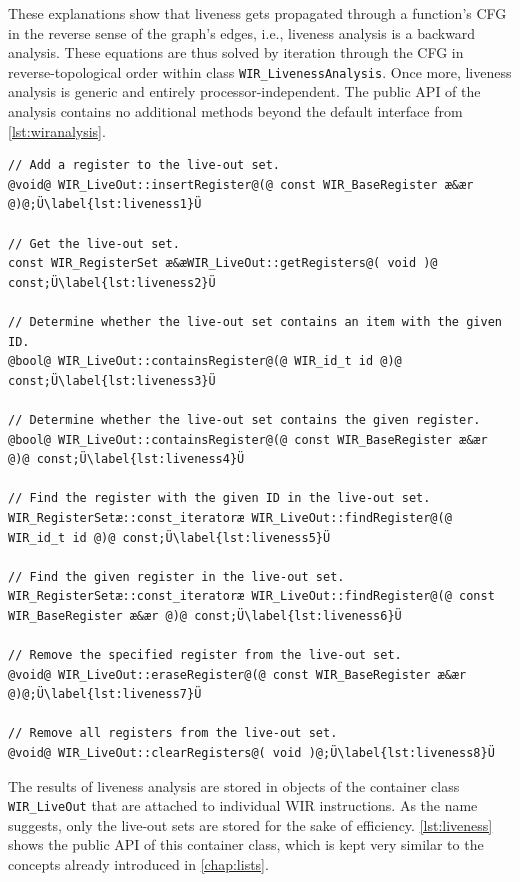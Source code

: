 These explanations show that liveness gets propagated through a function's \gls{CFG} in the reverse sense of the graph's edges, i.e., liveness analysis is a backward analysis.
These equations are thus solved by iteration through the \gls{CFG} in reverse-topological order within class \texttt{WIR\_LivenessAnalysis}.
Once more, liveness analysis is generic and entirely processor-independent.
The public \gls{API} of the analysis contains no additional methods beyond the default interface from \cref{lst:wiranalysis}.

\begin{lstlisting}[style=code,float=ht,caption={Liveness Handling of Container Class \texttt{WIR\_LiveOut}},label=lst:liveness]
// Add a register to the live-out set.
@void@ WIR_LiveOut::insertRegister@(@ const WIR_BaseRegister æ&ær @)@;Ü\label{lst:liveness1}Ü

// Get the live-out set.
const WIR_RegisterSet æ&æWIR_LiveOut::getRegisters@( void )@ const;Ü\label{lst:liveness2}Ü

// Determine whether the live-out set contains an item with the given ID.
@bool@ WIR_LiveOut::containsRegister@(@ WIR_id_t id @)@ const;Ü\label{lst:liveness3}Ü

// Determine whether the live-out set contains the given register.
@bool@ WIR_LiveOut::containsRegister@(@ const WIR_BaseRegister æ&ær @)@ const;Ü\label{lst:liveness4}Ü

// Find the register with the given ID in the live-out set.
WIR_RegisterSetæ::const_iteratoræ WIR_LiveOut::findRegister@(@ WIR_id_t id @)@ const;Ü\label{lst:liveness5}Ü

// Find the given register in the live-out set.
WIR_RegisterSetæ::const_iteratoræ WIR_LiveOut::findRegister@(@ const WIR_BaseRegister æ&ær @)@ const;Ü\label{lst:liveness6}Ü

// Remove the specified register from the live-out set.
@void@ WIR_LiveOut::eraseRegister@(@ const WIR_BaseRegister æ&ær @)@;Ü\label{lst:liveness7}Ü

// Remove all registers from the live-out set.
@void@ WIR_LiveOut::clearRegisters@( void )@;Ü\label{lst:liveness8}Ü
\end{lstlisting}

The results of liveness analysis are stored in objects of the container class \texttt{WIR\_LiveOut} that are attached to individual \gls{WIR} instructions.
As the name suggests, only the live-out sets are stored for the sake of efficiency.
\cref{lst:liveness} shows the public \gls{API} of this container class, which is kept very similar to the concepts already introduced in \cref{chap:lists}.

